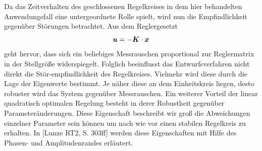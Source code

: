 Da das Zeitverhalten des geschlossenen Regelkreises in dem hier behandelten Anwendungsfall eine untergeordnete Rolle spielt, wird nun die Empfindlichkeit gegenüber Störungen betrachtet. Aus dem Reglergesetzt
\begin{equation}
\boldsymbol{u} = -\boldsymbol{K}\cdot\boldsymbol{x}
\end{equation}
geht hervor, dass sich ein beliebiges Messrauschen proportional zur Reglermatrix in der Stellgröße widerspiegelt. Folglich beeinflusst das Entwurfsverfahren nicht direkt die Stör-empfindlichkeit des Regelkreises. Vielmehr wird diese durch die Lage der Eigenwerte bestimmt. Je näher diese an dem Einheitskreis liegen, desto robuster wird das System gegenüber Messrauschen.
Ein weiterer Vorteil der linear quadratisch optimalen Regelung besteht in derer Robustheit gegenüber Parameteränderungen. Diese Eigenschaft beschreibt wir groß die Abweichungen einzelner Parameter sein können um nach wie vor einen stabilen Regelkreis zu erhalten. In [Lunze RT2, S. 303ff] werden diese Eigenschaften mit Hilfe des Phasen- und Amplitudenrandes erläutert.